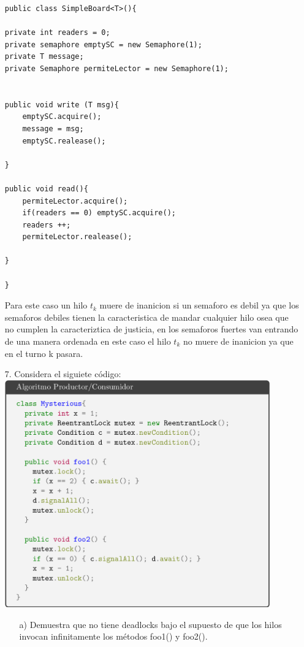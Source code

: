 \documentclass[12pt, letterpaper]{article}
\begin{document}
\begin{itemize}
\begin{lstlisting}
public class SimpleBoard<T>(){

private int readers = 0;
private semaphore emptySC = new Semaphore(1);
private T message;
private Semaphore permiteLector = new Semaphore(1);


public void write (T msg){
	emptySC.acquire();
	message = msg;
	emptySC.realease();

} 

public void read(){
	permiteLector.acquire();
	if(readers == 0) emptySC.acquire();
	readers ++;
	permiteLector.realease();

}

}

\end{lstlisting}


Para este caso un hilo $t_{k}$ muere de inanicion si un semaforo es debil ya que los semaforos debiles tienen la caracteristica de mandar cualquier hilo osea que no cumplen la caracteriztica de justicia, en los semaforos fuertes van entrando de una manera ordenada en este caso el hilo $t_{k}$ no muere de inanicion ya que en el turno k pasara.



\item[7. ]Considera el siguiete código:\\

\includegraphics[width=0.9\textwidth]{siete.png}\\
\begin{itemize}
\item[a) ]Demuestra que no tiene deadlocks bajo el supuesto de que los hilos invocan infinitamente los métodos foo1() y foo2().


\end{itemize}
\end{itemize}
\end{document}
